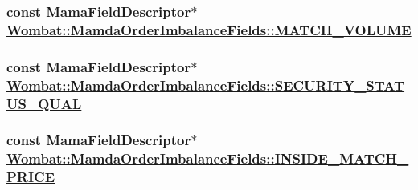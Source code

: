 \hypertarget{classWombat_1_1MamdaOrderImbalanceFields_2041fff9cb11ae7e00bb7a98f9cfc250}{
\subsubsection[MATCH\_\-VOLUME]{\setlength{\rightskip}{0pt plus 5cm}const Mama\-Field\-Descriptor$\ast$ \hyperlink{classWombat_1_1MamdaOrderImbalanceFields_2041fff9cb11ae7e00bb7a98f9cfc250}{Wombat::Mamda\-Order\-Imbalance\-Fields::MATCH\_\-VOLUME}}}
\label{classWombat_1_1MamdaOrderImbalanceFields_2041fff9cb11ae7e00bb7a98f9cfc250}


\hypertarget{classWombat_1_1MamdaOrderImbalanceFields_1fde5f26e36a92f6eb9d4ec729766203}{
\subsubsection[SECURITY\_\-STATUS\_\-QUAL]{\setlength{\rightskip}{0pt plus 5cm}const Mama\-Field\-Descriptor$\ast$ \hyperlink{classWombat_1_1MamdaOrderImbalanceFields_1fde5f26e36a92f6eb9d4ec729766203}{Wombat::Mamda\-Order\-Imbalance\-Fields::SECURITY\_\-STATUS\_\-QUAL}}}
\label{classWombat_1_1MamdaOrderImbalanceFields_1fde5f26e36a92f6eb9d4ec729766203}


\hypertarget{classWombat_1_1MamdaOrderImbalanceFields_b02b9e6b6293117e6ed80be80d3d8901}{
\subsubsection[INSIDE\_\-MATCH\_\-PRICE]{\setlength{\rightskip}{0pt plus 5cm}const Mama\-Field\-Descriptor$\ast$ \hyperlink{classWombat_1_1MamdaOrderImbalanceFields_b02b9e6b6293117e6ed80be80d3d8901}{Wombat::Mamda\-Order\-Imbalance\-Fields::INSIDE\_\-MATCH\_\-PRICE}}}
\label{classWombat_1_1MamdaOrderImbalanceFields_b02b9e6b6293117e6ed80be80d3d8901}


